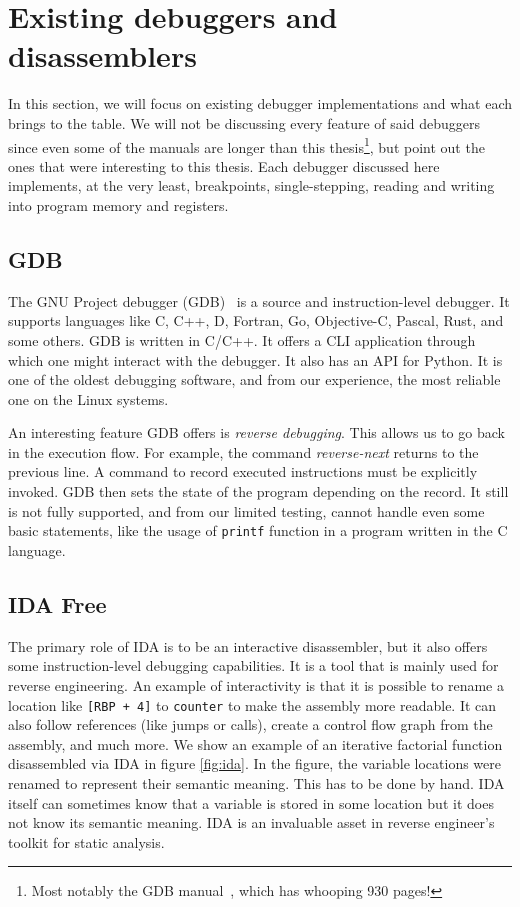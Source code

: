 \section{Existing debuggers and disassemblers}
In this section, we will focus on existing debugger implementations and what
each brings to the table. We will not be discussing every feature of said
debuggers since even some of the manuals are longer than this
thesis\footnote{Most notably the GDB manual~\cite{gdb-manual}, which has
whooping 930 pages!}, but point out the ones that were interesting to this
thesis. Each debugger discussed here implements, at the very least,
breakpoints, single-stepping, reading and writing into program memory and
registers.

\subsection{GDB}
The GNU Project debugger (GDB)~\cite{gdb-manual} is a source and
instruction-level debugger. It supports languages like C, C++, D, Fortran, Go,
Objective-C, Pascal, Rust, and some others. GDB is written in C/C++. It offers
a CLI application through which one might interact with the debugger. It also
has an API for Python. It is one of the oldest debugging software, and from our
experience, the most reliable one on the Linux systems.

An interesting feature GDB offers is \textit{reverse debugging}. This allows us
to go back in the execution flow. For example, the command
\textit{reverse-next} returns to the previous line. A command to record
executed instructions must be explicitly invoked. GDB then sets the state of
the program depending on the record. It still is not fully supported, and from
our limited testing, cannot handle even some basic statements, like the usage
of \texttt{printf} function in a program written in the C language.

\subsection{IDA Free}
The primary role of IDA is to be an interactive disassembler, but it also
offers some instruction-level debugging capabilities. It is a tool that is
mainly used for reverse engineering. An example of interactivity is that it is
possible to rename a location like \texttt{[RBP + 4]} to \texttt{counter} to
make the assembly more readable. It can also follow references (like jumps or
calls), create a control flow graph from the assembly, and much more. We show
an example of an iterative factorial function disassembled via IDA in figure
\ref{fig:ida}. In the figure, the variable locations were renamed to represent
their semantic meaning. This has to be done by hand. IDA itself can sometimes
know that a variable is stored in some location but it does not know its
semantic meaning. IDA is an invaluable asset in reverse engineer's toolkit
for static analysis.

